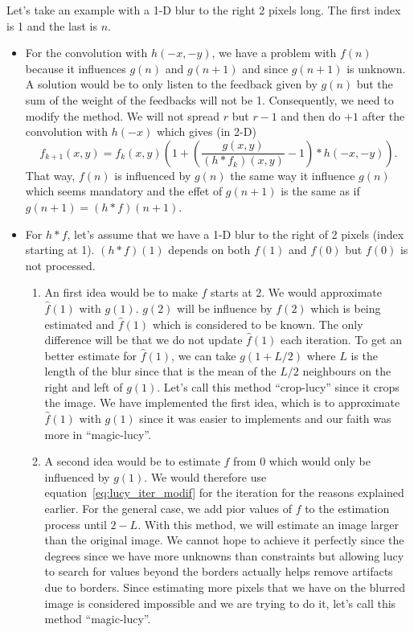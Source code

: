 Let's take an example with a 1-D blur to the right
2 pixels long. The first index is 1 and the last is $n$.
\begin{itemize}
  \item For the convolution with $h(-x,-y)$,
    we have a problem with $f(n)$ because it influences
    $g(n)$ and $g(n+1)$ and since $g(n+1)$ is unknown.
    A solution would be to only listen to the feedback given
    by $g(n)$ but the sum of the weight of the feedbacks
    will not be 1.
    Consequently, we need to modify the method.
    We will not spread $r$ but $r-1$ and then do $+1$
    after the convolution with $h(-x)$ which gives (in 2-D)
    \begin{equation}
      \label{eq:lucy_iter_modif}
      f_{k+1}(x,y) = f_k(x,y)\left(1+\left(\frac{g(x,y)}{(h*f_k)(x,y)}-1\right) * h(-x,-y)\right).
    \end{equation}
    That way, $f(n)$ is influenced by $g(n)$ the same
    way it influence $g(n)$ which seems mandatory and
    the effet of $g(n+1)$ is the same as if
    $g(n+1) = (h*f)(n+1)$.
  \item For $h * f$,
    let's assume that we have a 1-D blur to the right of 2 pixels
    (index starting at 1).
    $(h*f)(1)$ depends on both $f(1)$ and $f(0)$ but $f(0)$ is not processed.
    \begin{enumerate}
      \item An first idea would be to make $f$ starts at 2.
        We would approximate $\hat{f}(1)$ with $g(1)$.
        $g(2)$ will be influence by $f(2)$ which is being estimated
        and $\hat{f}(1)$ which is considered to be known.
        The only difference will be that we do not update $\hat{f}(1)$
        each iteration.
        To get an better estimate for $\hat{f}(1)$, we can take
        $g(1+L/2)$ where $L$ is the length of the blur since
        that is the mean of the $L/2$ neighbours on the right and left
        of $g(1)$.
        Let's call this method ``crop-lucy'' since it crops the image.
        We have implemented the first idea, which is to approximate
        $\hat{f}(1)$ with $g(1)$ since it was easier to implements
        and our faith was more in ``magic-lucy''.
      \item A second idea would be to estimate $f$ from 0
        which would only be influenced by $g(1)$.
        We would therefore use equation~\eqref{eq:lucy_iter_modif}
        for the iteration for the reasons explained earlier.
        For the general case, we add pior values of $f$ to the
        estimation process until $2-L$.
        With this method, we will estimate an image larger than
        the original image.
        We cannot hope to achieve it perfectly since the degrees since
        we have more unknowns than constraints but allowing
        lucy to search for values beyond the borders actually helps
        remove artifacts due to borders.
        Since estimating more pixels that we have on the blurred image
        is considered impossible and we are trying to do it,
        let's call this method ``magic-lucy''.
    \end{enumerate}
\end{itemize}

